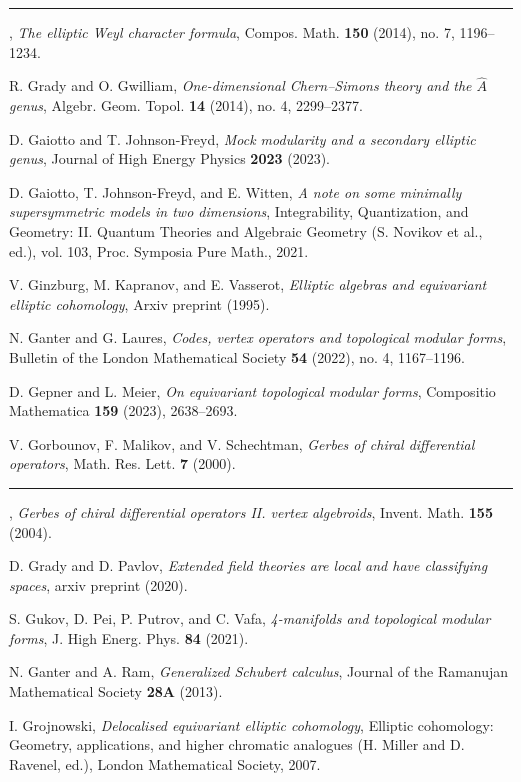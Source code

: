 \begin{description}[leftmargin=5.6em,labelwidth=5.2em,labelsep=0.4em,itemsep=0.5ex,parsep=0pt,topsep=0.8ex]
\item[\textbf{[Gan14]}] \rule[0.45ex]{2.6em}{0.45pt}, \textit{The elliptic Weyl character formula}, Compos. Math. \textbf{150} (2014), no. 7, 1196--1234.
\item[\textbf{[GG14]}] R. Grady and O. Gwilliam, \textit{One-dimensional Chern--Simons theory and the $\hat{A}$ genus}, Algebr. Geom. Topol. \textbf{14} (2014), no. 4, 2299--2377.
\item[\textbf{[GJF23]}] D. Gaiotto and T. Johnson-Freyd, \textit{Mock modularity and a secondary elliptic genus}, Journal of High Energy Physics \textbf{2023} (2023).
\item[\textbf{[GJFW21]}] D. Gaiotto, T. Johnson-Freyd, and E. Witten, \textit{A note on some minimally supersymmetric models in two dimensions}, Integrability, Quantization, and Geometry: II. Quantum Theories and Algebraic Geometry (S. Novikov et al., ed.), vol. 103, Proc. Symposia Pure Math., 2021.
\item[\textbf{[GKV95]}] V. Ginzburg, M. Kapranov, and E. Vasserot, \textit{Elliptic algebras and equivariant elliptic cohomology}, Arxiv preprint (1995).
\item[\textbf{[GL22]}] N. Ganter and G. Laures, \textit{Codes, vertex operators and topological modular forms}, Bulletin of the London Mathematical Society \textbf{54} (2022), no. 4, 1167--1196.
\item[\textbf{[GM23]}] D. Gepner and L. Meier, \textit{On equivariant topological modular forms}, Compositio Mathematica \textbf{159} (2023), 2638--2693.
\item[\textbf{[GMS00]}] V. Gorbounov, F. Malikov, and V. Schechtman, \textit{Gerbes of chiral differential operators}, Math. Res. Lett. \textbf{7} (2000).
\item[\textbf{[GMS04]}] \rule[0.45ex]{2.6em}{0.45pt}, \textit{Gerbes of chiral differential operators II. vertex algebroids}, Invent. Math. \textbf{155} (2004).
\item[\textbf{[GP20]}] D. Grady and D. Pavlov, \textit{Extended field theories are local and have classifying spaces}, arxiv preprint (2020).
\item[\textbf{[GPPV21]}] S. Gukov, D. Pei, P. Putrov, and C. Vafa, \textit{4-manifolds and topological modular forms}, J. High Energ. Phys. \textbf{84} (2021).
\item[\textbf{[GR13]}] N. Ganter and A. Ram, \textit{Generalized Schubert calculus}, Journal of the Ramanujan Mathematical Society \textbf{28A} (2013).
\item[\textbf{[Gro07]}] I. Grojnowski, \textit{Delocalised equivariant elliptic cohomology}, Elliptic cohomology: Geometry, applications, and higher chromatic analogues (H. Miller and D. Ravenel, ed.), London Mathematical Society, 2007.

\end{description}
